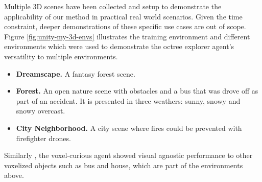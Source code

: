 

Multiple 3D scenes have been collected and setup to demonstrate the applicability of our method in practical real world scenarios. Given the time constraint, deeper demonstrations of these specific use cases are out of scope.
Figure \ref{fig:unity-my-3d-envs} illustrates the training environment and different environments which were used to demonstrate the octree explorer agent's versatility to multiple environments.
\begin{itemize}
    \item \textbf{Dreamscape.} A fantasy forest scene.
    \item \textbf{Forest.} An open nature scene with obstacles and a bus that was drove off as part of an accident. It is presented in three weathers: sunny, snowy and snowy overcast.
    \item \textbf{City Neighborhood.} A city scene where fires could be prevented with firefighter drones.
\end{itemize}

Similarly , the voxel-curious agent showed visual agnostic performance to other voxelized objects such as bus and house, which are part of the environments above. 





